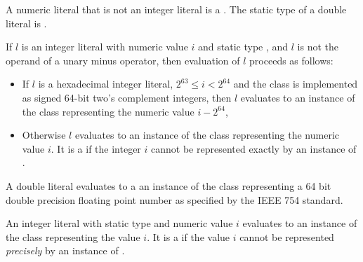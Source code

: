 \documentclass[makeidx]{article}
\begin{document}
{\LMHash{}%
A numeric literal that is not an integer literal is a
.
The static type of a double literal is .

\LMHash{}%
If $l$ is an integer literal with numeric value $i$ and static type ,
and $l$ is not the operand of a unary minus operator,
then evaluation of $l$ proceeds as follows:
\begin{itemize}
  \item{} If $l$ is a hexadecimal integer literal,
  $2^{63} \le i < 2^{64}$ and the  class is implemented as
  signed 64-bit two's complement integers,
  then $l$ evaluates to an instance of the  class
  representing the numeric value $i - 2^{64}$,
  \item{} Otherwise $l$ evaluates to an instance of the  class
  representing the numeric value $i$.
  It is a  if the integer $i$ cannot be represented
  exactly by an instance of .
\end{itemize}


\LMHash{}%
A double literal evaluates to a an instance of the  class
representing a 64 bit double precision floating point number
as specified by the IEEE 754 standard.

\LMHash{}%
An integer literal with static type  and numeric value $i$
evaluates to an instance of the  class representing the value $i$.
It is a  if the value $i$
cannot be represented \emph{precisely} by an instance of .


}
\end{document}

